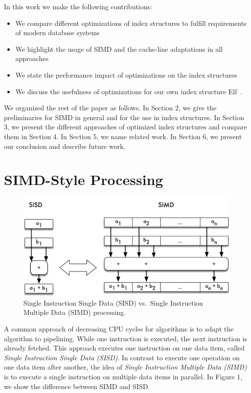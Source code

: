 \documentclass[runningheads,a4paper]{llncs}
\begin{document}
In this work we make the following contributions:
\begin{itemize}
	\item We compare different optimizations of index structures to fulfill requirements of modern database systems
	\item We highlight the usage of SIMD and the cache-line adaptations in all approaches
	\item We state the performance impact of optimizations on the index structures
	\item We discuss the usefulness of optimizations for our own index structure Elf~\cite{BKS+17}.
\end{itemize}
We organized the rest of the paper as follows. In Section 2, we give the preliminaries for SIMD in general and for the use in index structures. In Section 3, we present the different approaches of optimized index structures and compare them in Section 4. In Section 5, we name related work. In Section 6, we present our conclusion and describe future work. 
\section{SIMD-Style Processing}
\begin{figure} \vspace{-60pt}
  \begin{center}
	\includegraphics[width=.45\textwidth]{SIMD}
	\caption{Single Instruction Single Data (SISD) vs.\ Single Instruction Multiple Data (SIMD) processing.}
	\label{fig}  \end{center}
  \vspace{-20pt}
\end{figure} 
A common approach of decreasing CPU cycles for algorithms is to adapt the algorithm to pipelining. While one instruction is executed, the next instruction is already fetched. This approach executes one instruction on one data item, called \textit{Single Instruction Single Data (SISD)}. In contrast to execute one operation on one data item after another, the idea of \textit{Single Instruction Multiple Data (SIMD)} is to execute a single instruction on multiple data items in parallel. In Figure 1, we show the difference between SIMD and SISD. 
\end{document}
